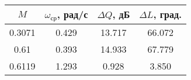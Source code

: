 \begin{tabular}{|c|c|c|c|}
\hline
   $M$ &  $\omega_{ср}$, рад/с &  $\Delta Q$, дБ &  $\Delta L$, град. \\
\hline
0.3071 &                 0.429 &          13.717 &             66.072 \\
  0.61 &                 0.393 &          14.933 &             67.779 \\
0.6119 &                 1.293 &           0.928 &              3.850 \\
\hline
\end{tabular}
